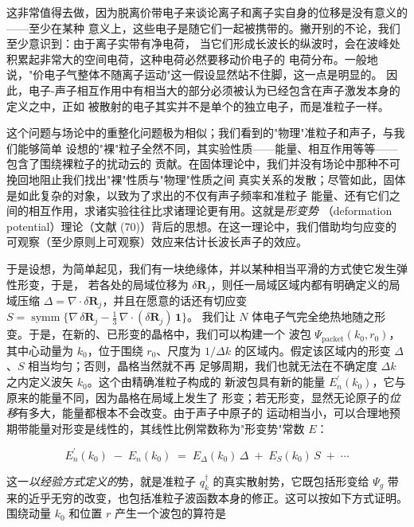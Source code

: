 这非常值得去做，因为脱离价带电子来谈论离子和离子实自身的位移是没有意义的——至少在某种
意义上，这些电子是随它们一起被携带的。撇开别的不论，我们至少意识到：由于离子实带有净电荷，
当它们形成长波长的纵波时，会在波峰处积累起非常大的空间电荷，这种电荷必然要移动价电子的
电荷分布。一般地说，"价电子气整体不随离子运动"这一假设显然站不住脚，这一点是明显的。
因此，电子-声子相互作用中有相当大的部分必须被认为已经包含在声子激发本身的定义之中，正如
被散射的电子其实并不是单个的独立电子，而是准粒子一样。

这个问题与场论中的重整化问题极为相似；我们看到的"物理"准粒子和声子，与我们能够简单
设想的"裸"粒子全然不同，其实验性质——能量、相互作用等等——包含了围绕裸粒子的扰动云的
贡献。在固体理论中，我们并没有场论中那种不可挽回地阻止我们找出"裸"性质与"物理"性质之间
真实关系的发散；尽管如此，固体是如此复杂的对象，以致为了求出的不仅有声子频率和准粒子
能量、还有它们之间的相互作用，求诸实验往往比求诸理论更有用。这就是\emph{形变势}
（deformation potential）理论（文献 (70)）背后的思想。在这一理论中，我们借助均匀应变的
可观察（至少原则上可观察）效应来估计长波长声子的效应。

于是设想，为简单起见，我们有一块绝缘体，并以某种相当平滑的方式使它发生弹性形变，于是，
若各处的局域位移为 $\delta\mathbf{R}_{j}$，则任一局域区域内都有明确定义的局域压缩
$\Delta=\nabla\cdot\delta\mathbf{R}_{j}$，并且在愿意的话还有切应变
$S=\operatorname{symm}\bigl\{\nabla\,\delta\mathbf{R}_{j}-\tfrac{1}{3}\,\nabla\cdot(\delta\mathbf{R}_{j})\,\mathbf{1}\bigr\}$。
我们让 $N$ 体电子气完全绝热地随之形变。于是，在新的、已形变的晶格中，我们可以构建一个
波包 $\Psi_{\text{packet}}(k_{0},r_{0})$，其中心动量为 $k_{0}$，位于围绕 $r_{0}$、尺度为
$1/\Delta k$ 的区域内。假定该区域内的形变 $\Delta$、$S$ 相当均匀；否则，晶格当然就不再
足够周期，我们也就无法在不确定度 $\Delta k$ 之内定义波矢 $k_{0}$。这个由精确准粒子构成的
新波包具有新的能量 $E^{\prime}_{n}(k_{0})$，它与原来的能量不同，因为晶格在局域上发生了
形变；若无形变，显然无论原子的\emph{位移}有多大，能量都根本不会改变。由于声子中原子的
运动相当小，可以合理地预期带能量对形变是线性的，其线性比例常数称为"形变势"常数 $E$：

\begin{equation*}
E^{\prime}_{n}(k_{0}) \;-\; E_{n}(k_{0}) \;=\; E_{\Delta}(k_{0})\,\Delta \;+\; E_{S}(k_{0})\, S \;+\; \cdots
\tag{8}
\end{equation*}

这一\emph{以经验方式定义的}势，就是准粒子 $q_{k}^{\dagger}$ 的真实散射势，它既包括形变给
$\Psi_{g}$ 带来的近乎无穷的改变，也包括准粒子波函数本身的修正。这可以按如下方式证明。
围绕动量 $k_{0}$ 和位置 $r$ 产生一个波包的算符是

